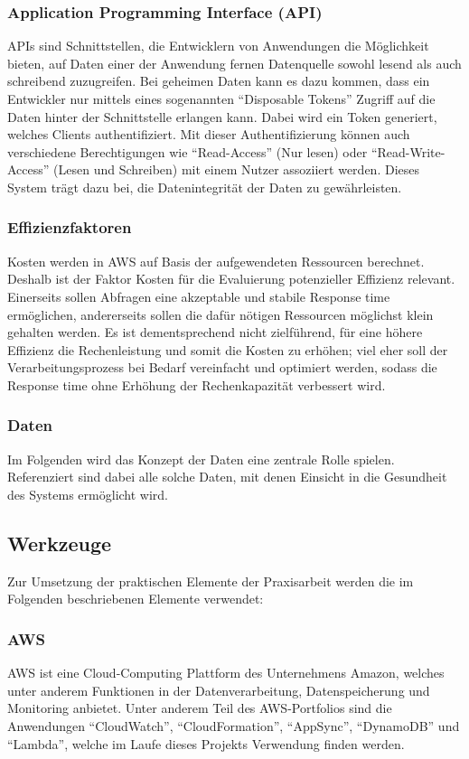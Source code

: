 \subsubsection{Application Programming Interface (API)}
APIs sind Schnittstellen, die Entwicklern von Anwendungen die Möglichkeit bieten, auf Daten einer der Anwendung fernen Datenquelle sowohl lesend als auch schreibend zuzugreifen. \cite{Fielding2000} Bei geheimen Daten kann es dazu kommen, dass ein Entwickler nur mittels eines sogenannten ``Disposable Tokens'' Zugriff auf die Daten hinter der Schnittstelle erlangen kann. Dabei wird ein Token generiert, welches Clients authentifiziert. Mit dieser Authentifizierung können auch verschiedene Berechtigungen wie ``Read-Access'' (Nur lesen) oder ``Read-Write-Access'' (Lesen und Schreiben) mit einem Nutzer assoziiert werden. Dieses System trägt dazu bei, die Datenintegrität der Daten zu gewährleisten.
\subsubsection{Effizienzfaktoren} 
Kosten werden in AWS auf Basis der aufgewendeten Ressourcen berechnet. \cite{Kavis2014} Deshalb ist der Faktor Kosten für die Evaluierung potenzieller Effizienz relevant. Einerseits sollen Abfragen eine akzeptable und stabile Response time ermöglichen, andererseits sollen die dafür nötigen Ressourcen möglichst klein gehalten werden. Es ist dementsprechend nicht zielführend, für eine höhere Effizienz die Rechenleistung und somit die Kosten zu erhöhen; viel eher soll der Verarbeitungsprozess bei Bedarf vereinfacht und optimiert werden, sodass die Response time ohne Erhöhung der Rechenkapazität verbessert wird. \cite{AWS2024e} 
\subsubsection{Daten}
Im Folgenden wird das Konzept der Daten eine zentrale Rolle spielen. Referenziert sind dabei alle solche Daten, mit denen Einsicht in die Gesundheit des Systems ermöglicht wird. 
\subsection{Werkzeuge} 
Zur Umsetzung der praktischen Elemente der Praxisarbeit werden die im Folgenden beschriebenen Elemente verwendet: 
\subsubsection{AWS} 
AWS ist eine Cloud-Computing Plattform des Unternehmens Amazon, welches unter anderem Funktionen in der Datenverarbeitung, Datenspeicherung und Monitoring anbietet. Unter anderem Teil des AWS-Portfolios sind die Anwendungen ``CloudWatch'', ``CloudFormation'', ``AppSync'', ``DynamoDB'' und ``Lambda'', welche im Laufe dieses Projekts Verwendung finden werden. \cite{Zhang2010} 
